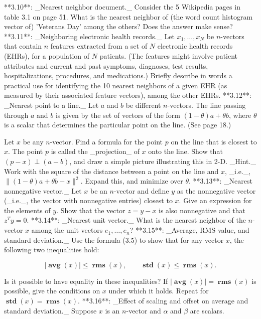 

**3.10**: _Nearest neighbor document._ Consider the 5 Wikipedia pages in table 3.1 on page 51. What is the nearest neighbor of (the word count histogram vector of) 'Veterans Day' among the others? Does the answer make sense?
**3.11**: _Neighboring electronic health records._ Let \(x_{1},\ldots,x_{N}\) be \(n\)-vectors that contain \(n\) features extracted from a set of \(N\) electronic health records (EHRs), for a population of \(N\) patients. (The features might involve patient attributes and current and past symptoms, diagnoses, test results, hospitalizations, procedures, and medications.) Briefly describe in words a practical use for identifying the 10 nearest neighbors of a given EHR (as measured by their associated feature vectors), among the other EHRs.
**3.12**: _Nearest point to a line._ Let \(a\) and \(b\) be different \(n\)-vectors. The line passing through \(a\) and \(b\) is given by the set of vectors of the form \((1-\theta)a+\theta b\), where \(\theta\) is a scalar that determines the particular point on the line. (See page 18.)

Let \(x\) be any \(n\)-vector. Find a formula for the point \(p\) on the line that is closest to \(x\). The point \(p\) is called the _projection_ of \(x\) onto the line. Show that \((p-x)\perp(a-b)\), and draw a simple picture illustrating this in 2-D. _Hint._ Work with the square of the distance between a point on the line and \(x\), _i.e._, \(\|(1-\theta)a+\theta b-x\|^{2}\). Expand this, and minimize over \(\theta\).
**3.13**: _Nearest nonnegative vector._ Let \(x\) be an \(n\)-vector and define \(y\) as the nonnegative vector (_i.e._, the vector with nonnegative entries) closest to \(x\). Give an expression for the elements of \(y\). Show that the vector \(z=y-x\) is also nonnegative and that \(z^{T}y=0\).
**3.14**: _Nearest unit vector._ What is the nearest neighbor of the \(n\)-vector \(x\) among the unit vectors \(e_{1},\ldots,e_{n}\)?
**3.15**: _Average, RMS value, and standard deviation._ Use the formula (3.5) to show that for any vector \(x\), the following two inequalities hold:

\[|\operatorname{\mathbf{avg}}(x)|\leq\operatorname{\mathbf{rms}}(x),\qquad \operatorname{\mathbf{std}}(x)\leq\operatorname{\mathbf{rms}}(x).\]

Is it possible to have equality in these inequalities? If \(|\operatorname{\mathbf{avg}}(x)|=\operatorname{\mathbf{rms}}(x)\) is possible, give the conditions on \(x\) under which it holds. Repeat for \(\operatorname{\mathbf{std}}(x)=\operatorname{\mathbf{rms}}(x)\).
**3.16**: _Effect of scaling and offset on average and standard deviation._ Suppose \(x\) is an \(n\)-vector and \(\alpha\) and \(\beta\) are scalars.

